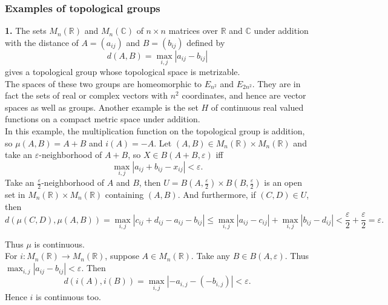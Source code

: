 \documentclass[a4paper]{article}
\theoremstyle{plain}%
\theoremstyle{definition}
\theoremstyle{remark}
\begin{document}
    \subsubsection*{Examples of topological groups}
    \textbf{1.} The sets $M_n(\mathbb{R})$ and $M_n(\mathbb{C})$ of $n \times
    n$ matrices over $\mathbb{R}$ and $\mathbb{C}$ under addition with the
    distance of $A = \left( a_{i j} \right) $ and
    $B = \left(  b_{i j} \right) $ defined by
    \[
    d\left( A,B \right) = \max_{i,j} \left| a_{ij} - b_{i j} \right| 
    \] 
    gives a topological group whose topological space is metrizable.\\
    The spaces of these two groups are homeomorphic to $E_{n^2}$ and
    $E_{2n^2}$. They are in fact the sets of real or complex vectors with
    $n^2$ coordinates, and hence are vector spaces as well as groups. Another
    example is the set $H$ of continuous real valued functions on a compact
    metric space under addition.\\
    In this example, the multiplication function on the topological group is
    addition, so $\mu (A,B) = A+B$ and
    $i(A) = -A$. Let $(A,B) \in M_n(\mathbb{R}) \times M_n(\mathbb{R})$ and 
    take an $\varepsilon$-neighborhood of $A+B$, so
    $X \in B(A+B,\varepsilon)$ iff
     \[
    \max_{i,j} \left| a_{ij} + b_{ij} - x_{i j} \right| < \varepsilon.
    \] 
    Take an $\frac{\varepsilon}{2}$-neighborhood of $A$ and $B$, then
    $U=B(A, \frac{\varepsilon}{2}) \times B(B, \frac{\varepsilon}{2})$ is an open
    set in $M_n(\mathbb{R}) \times M_n(\mathbb{R})$ containing $(A,B)$. And
    furthermore, if $(C,D) \in U$, then
    \[
    d(\mu(C,D), \mu(A,B)) =
    \max_{i,j} \left| c_{ij} + d_{i j} - a_{i j} - b_{i j} \right| 
    \le \max_{i,j} \left| a_{ij} - c_{ij} \right| +
    \max_{i,j} \left| b_{ij}-d_{ij} \right| 
    < \frac{\varepsilon}{2}+ \frac{\varepsilon}{2} = \varepsilon.
    \] 
    
    Thus $\mu$ is continuous.\\
    \linebreak
    For $i  \colon M_n(\mathbb{R}) \to M_n(\mathbb{R})$, suppose
    $A \in M_n(\mathbb{R})$. Take any
    $B \in B(A, \varepsilon)$. Thus
    $\max_{i,j} \left| a_{ij}-b_{ij} \right| < \varepsilon$. Then
    \[
    d\left( i(A), i(B) \right) 
    = \max_{i,j} \left| -a_{i,j} - (-b_{i,j}) \right| 
    < \varepsilon.
    \] 
    Hence $i$ is continuous too.\\
    \linebreak
\end{document}
